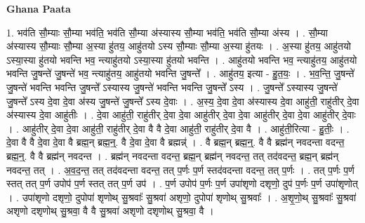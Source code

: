 \documentclass[17pt]{extarticle}
\begin{document}
\textbf{Ghana Paata } \newline

1. भव॑ति सौ॒म्याः सौ॒म्या भव॑ति॒ भव॑ति सौ॒म्या अ॑स्यास्य सौ॒म्या भव॑ति॒ भव॑ति सौ॒म्या अ॑स्य । . सौ॒म्या अ॑स्यास्य सौ॒म्याः सौ॒म्या अ॒स्या हु॑तय॒ आहु॑तयो ऽस्य सौ॒म्याः सौ॒म्या अ॒स्या हु॑तयः । . अ॒स्या हु॑तय॒ आहु॑तयो ऽस्या॒स्या हु॑तयो भवन्ति भव॒ न्त्याहु॑तयो ऽस्या॒स्या हु॑तयो भवन्ति । . आहु॑तयो भवन्ति भव॒ न्त्याहु॑तय॒ आहु॑तयो भवन्ति जु॒षन्ते॑ जु॒षन्ते॑ भव॒ न्त्याहु॑तय॒ आहु॑तयो भवन्ति जु॒षन्ते᳚ । . आहु॑तय॒ इत्या - हु॒त॒यः॒ । . भ॒व॒न्ति॒ जु॒षन्ते॑ जु॒षन्ते॑ भवन्ति भवन्ति जु॒षन्ते᳚ ऽस्यास्य जु॒षन्ते॑ भवन्ति भवन्ति जु॒षन्ते᳚ ऽस्य । . जु॒षन्ते᳚ ऽस्यास्य जु॒षन्ते॑ जु॒षन्ते᳚ ऽस्य दे॒वा दे॒वा अ॑स्य जु॒षन्ते॑ जु॒षन्ते᳚ ऽस्य दे॒वाः । . अ॒स्य॒ दे॒वा दे॒वा अ॑स्यास्य दे॒वा आहु॑ती॒ राहु॑तीर् दे॒वा अ॑स्यास्य दे॒वा आहु॑तीः । . दे॒वा आहु॑ती॒ राहु॑तीर् दे॒वा दे॒वा आहु॑तीर् दे॒वा दे॒वा आहु॑तीर् दे॒वा दे॒वा आहु॑तीर् दे॒वाः । . आहु॑तीर् दे॒वा दे॒वा आहु॑ती॒ राहु॑तीर् दे॒वा वै वै दे॒वा आहु॑ती॒ राहु॑तीर् दे॒वा वै । . आहु॑ती॒रित्या - हु॒तीः॒ । . दे॒वा वै वै दे॒वा दे॒वा वै ब्रह्म॒न् ब्रह्म॒न्॒. वै दे॒वा दे॒वा वै ब्रह्मन्न्॑ । . वै ब्रह्म॒न् ब्रह्म॒न्॒. वै वै ब्रह्म॑न् नवदन्ता वदन्त॒ ब्रह्म॒न्॒. वै वै ब्रह्म॑न् नवदन्त । . ब्रह्म॑न् नवदन्ता वदन्त॒ ब्रह्म॒न् ब्रह्म॑न् नवदन्त॒ तत् तद॑वदन्त॒ ब्रह्म॒न् ब्रह्म॑न् नवदन्त॒ तत् । . अ॒व॒द॒न्त॒ तत् तद॑वदन्ता वदन्त॒ तत् प॒र्णः प॒र्ण स्तद॑वदन्ता वदन्त॒ तत् प॒र्णः । . तत् प॒र्णः प॒र्ण स्तत् तत् प॒र्ण उपोप॑ प॒र्ण स्तत् तत् प॒र्ण उप॑ । . प॒र्ण उपोप॑ प॒र्णः प॒र्ण उपा॑शृणो दशृणो॒ दुप॑ प॒र्णः प॒र्ण उपा॑शृणोत् । . उपा॑शृणो दशृणो॒ दुपोपा॑ शृणोथ् सु॒श्रवाः᳚ सु॒श्रवा॑ अशृणो॒ दुपोपा॑ शृणोथ् सु॒श्रवाः᳚ । . अ॒शृ॒णो॒थ् सु॒श्रवाः᳚ सु॒श्रवा॑ अशृणो दशृणोथ् सु॒श्रवा॒ वै वै सु॒श्रवा॑ अशृणो दशृणोथ् सु॒श्रवा॒ वै । \newline
\end{document}
